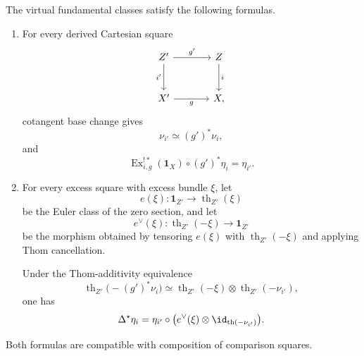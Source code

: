 \begin{proposition}
\label{prop:virtual-class-base-change-excess}
The virtual fundamental classes satisfy the following formulas.

\begin{enumerate}
    \item For every derived Cartesian square
    \[
    \begin{tikzcd}[column sep=large,row sep=large]
        Z' \arrow[r,"g'"] \arrow[d,"i'"']
            & Z \arrow[d,"i"] \\
        X' \arrow[r,"g"']
            & X,
    \end{tikzcd}
    \]
    cotangent base change gives
    \[
        \nu_{i'}
        \simeq
        (g')^*\nu_i,
    \]
    and
    \[
        \operatorname{Ex}^{!*}_{i,g}(\mathbf1_X)
        \circ
        (g')^*\eta_i
        =
        \eta_{i'}.
    \]

    \item For every excess square with excess bundle \(\xi\), let
    \[
        e(\xi):
        \mathbf1_{Z'}
        \longrightarrow
        \operatorname{th}_{Z'}(\xi)
    \]
    be the Euler class of the zero section, and let
    \[
        e^\vee(\xi):
        \operatorname{th}_{Z'}(-\xi)
        \longrightarrow
        \mathbf1_{Z'}
    \]
    be the morphism obtained by tensoring \(e(\xi)\) with
    \(\operatorname{th}_{Z'}(-\xi)\) and applying Thom cancellation.

    Under the Thom-additivity equivalence
    \[
        \operatorname{th}_{Z'}
        \bigl(
          -(g')^*\nu_i
        \bigr)
        \simeq
        \operatorname{th}_{Z'}(-\xi)
        \otimes
        \operatorname{th}_{Z'}(-\nu_{i'}),
    \]
    one has
    \[
        \Delta^\star\eta_i
        =
        \eta_{i'}
        \circ
        \bigl(
          e^\vee(\xi)
          \otimes
          \id_{\operatorname{th}(-\nu_{i'})}
        \bigr).
    \]
\end{enumerate}

Both formulas are compatible with composition of comparison squares.
\end{proposition}

